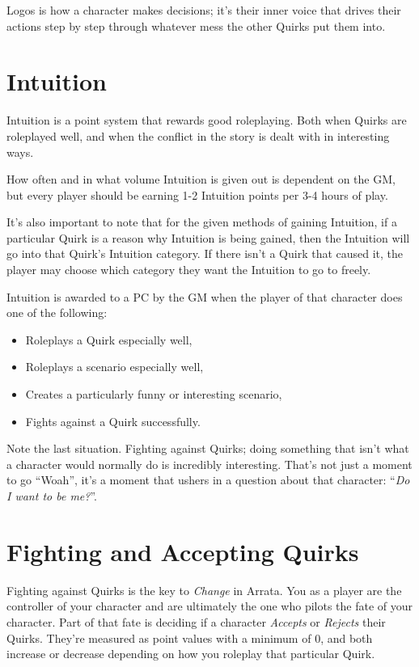 \documentclass[../main.tex]{subfiles}
\begin{document}
    Logos is how a character makes decisions; it's their inner voice that drives their actions step by step through whatever mess the other Quirks put them into.

    \section{Intuition}

    Intuition is a point system that rewards good roleplaying. Both when Quirks are roleplayed well, and when the conflict in the story is dealt with in interesting ways.

    How often and in what volume Intuition is given out is dependent on the GM, but every player should be earning 1-2 Intuition points per 3-4 hours of play.

    It's also important to note that for the given methods of gaining Intuition, if a particular Quirk is a reason why Intuition is being gained, then the Intuition will go into that Quirk's Intuition category. If there isn't a Quirk that caused it, the player may choose which category they want the Intuition to go to freely.

    Intuition is awarded to a PC by the GM when the player of that character does one of the following:

    \begin{itemize}
        \item Roleplays a Quirk especially well,
        \item Roleplays a scenario especially well,
        \item Creates a particularly funny or interesting scenario,
        \item Fights against a Quirk successfully.
    \end{itemize}

    Note the last situation. Fighting against Quirks; doing something that isn't what a character would normally do is incredibly interesting. That's not just a moment to go ``Woah'', it's a moment that ushers in a question about that character: ``\emph{Do I want to be me?}''.

    \section{Fighting and Accepting Quirks}
    
    Fighting against Quirks is the key to \emph{Change} in Arrata. You as a player are the controller of your character and are ultimately the one who pilots the fate of your character. Part of that fate is deciding if a character \emph{Accepts} or \emph{Rejects} their Quirks. They're measured as point values with a minimum of 0, and both increase or decrease depending on how you roleplay that particular Quirk.
\end{document}
